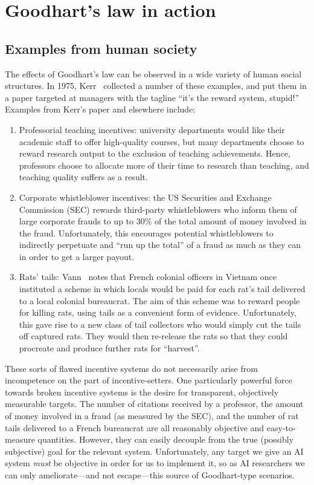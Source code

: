 \documentclass[11pt]{article}
\begin{document}
\section{Goodhart's law in action}

\subsection{Examples from human society}

The effects of Goodhart's law can be observed in a wide variety of human social
structures.
%
In 1975, Kerr~\cite{kerr75folly} collected a number of these examples, and put
them in a paper targeted at managers with the tagline ``it's the reward system,
stupid!''
%
Examples from Kerr's paper and elsewhere include:
%
\begin{enumerate}
  \item Professorial teaching incentives: university departments would like their
    academic staff to offer high-quality courses, but many departments choose to
    reward research output to the exclusion of teaching achievements.
    Hence, professors choose to allocate more of their time to research than
    teaching, and teaching quality suffers as a result.

  \item Corporate whistleblower incentives: the US Securities and
    Exchange Commission (SEC) rewards third-party whistleblowers who inform them
    of large corporate frauds to up to 30\% of the total amount of money
    involved in the fraud.
    Unfortunately, this encourages potential whistleblowers to indirectly
    perpetuate and ``run up the total'' of a fraud as much as they can in order
    to get a larger payout.

  \item Rats' tails: Vann~\cite{vann03rats} notes that French colonial officers
    in Vietnam once instituted a scheme in which locals would be paid for each
    rat's tail delivered to a local colonial bureaucrat.
    The aim of this scheme was to reward people for killing rats, using tails as
    a convenient form of evidence.
    Unfortunately, this gave rise to a new class of tail collectors who would
    simply cut the tails off captured rats.
    They would then re-release the rats so that they could procreate and produce
    further rats for ``harvest''.
\end{enumerate}

These sorts of flawed incentive systems do not necessarily arise from
incompetence on the part of incentive-setters.
%
One particularly powerful force towards broken incentive systems is the desire
for transparent, objectively measurable targets.
%
The number of citations received by a professor, the amount of money involved in
a fraud (as measured by the SEC), and the number of rat tails delivered to a
French bureaucrat are all reasonably objective and easy-to-measure quantities.
%
However, they can easily decouple from the true (possibly subjective) goal for
the relevant system.
%
Unfortunately, any target we give an AI system \textit{must} be objective in
order for us to implement it, so as AI researchers we can only ameliorate---and
not escape---this source of Goodhart-type scenarios.
\end{document}
